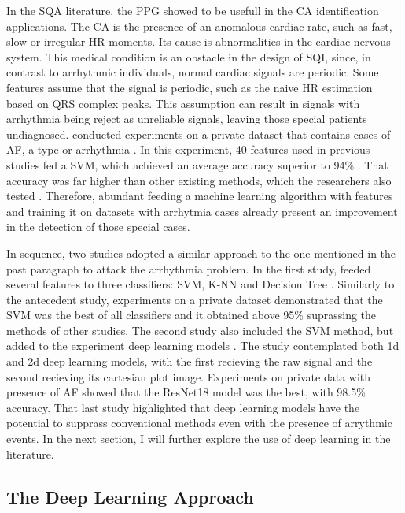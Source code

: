 In the \acrshort{SQA} literature, the \acrshort{PPG} showed to be usefull in the \acrlong{CA} identification applications. The \acrfull{CA} is the presence of an anomalous cardiac rate, such as fast, slow or irregular \acrshort{HR} moments. Its cause is abnormalities in the cardiac nervous system. This medical condition is an obstacle in the design of \acrshort{SQI}, since, in contrast to arrhythmic individuals, normal cardiac signals are periodic. Some features assume that the signal is periodic, such as the naive \acrshort{HR} estimation based on QRS complex peaks. This assumption can result in signals with arrhythmia being reject as unreliable signals, leaving those special patients undiagnosed. \citeauthor{review-5} conducted experiments on a private dataset that contains cases of \acrfull{AF}, a type or arrhythmia \cite{review-5}. In this experiment, 40 features used in previous studies fed a \acrshort{SVM}, which achieved an average accuracy superior to 94\% \cite{review-5}. That accuracy was far higher than other existing methods, which the researchers also tested \cite{review-5}. Therefore, abundant feeding a machine learning algorithm with features and training it on datasets with arrhytmia cases already present an improvement in the detection of those special cases.

In sequence, two studies adopted a similar approach to the one mentioned in the past paragraph to attack the arrhythmia problem. In the first study, \citeauthor{review-6} feeded several features to three classifiers: \acrshort{SVM}, \acrshort{K-NN} and Decision Tree \cite{review-6}. Similarly to the antecedent study, experiments on a private dataset demonstrated that the \acrshort{SVM} was the best of all classifiers and it obtained above 95\% suprassing the methods of other studies. The second study also included the \acrshort{SVM} method, but added to the experiment deep learning models \cite{review-7}. The study contemplated both 1d and 2d deep learning models, with the first recieving the raw signal and the second recieving its cartesian plot image. Experiments on private data with presence of \acrshort{AF} showed that the ResNet18 model was the best, with 98.5\% accuracy. That last study highlighted that deep learning models have the potential to supprass conventional methods even with the presence of arrythmic events. In the next section, I will further explore the use of deep learning in the literature.  

\subsection{The Deep Learning Approach}
\label{sec:deep_learning}

